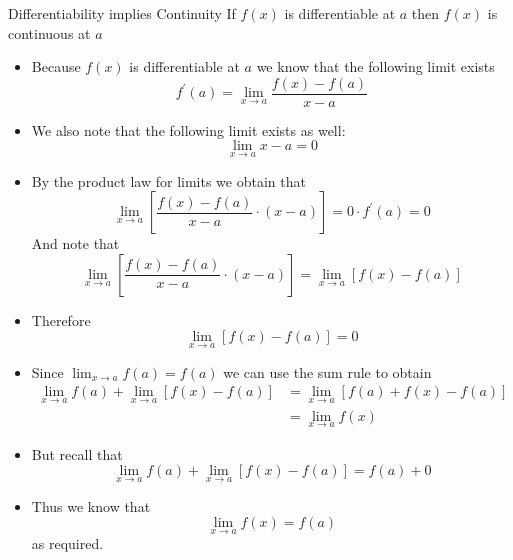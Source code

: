 \documentclass[preview]{standalone}
\begin{document}
\begin{theo*}{Differentiability implies Continuity}
  If $f\left(x\right)$ is differentiable at $a$ then $f\left(x\right)$ is continuous at $a$ 
  \begin{pf}
    \begin{itemize}
     \item Because $f\left(x\right)$ is differentiable at $a$  we know that the following limit exists 
       \[
       f ^{ \prime }\left(a\right) = \lim_{x \to a } \frac{ f\left(x\right)  -  f\left(a\right)}{ x  -  a}
       \]
      \item We also note that the following limit exists as well:
        \[
        \lim_{x\to a} x  -  a = 0
        \]
      \item By the product law for limits we obtain that 
        \[
        \lim_{x \to a} \left[ \frac{f\left(x\right)  -  f\left(a\right)}{x  -  a}  \cdot  \left( x  -  a \right)  \right] = 0  \cdot  f ^{\prime}\left(a\right) = 0
        \]
        And note that  
        \[
          \lim_{x \to a} \left[ \frac{f\left(x\right)  -  f\left(a\right)}{x  -  a}  \cdot  \left( x  -  a \right)  \right] = \lim_{x \to a} \left[f\left(x\right)  -  f\left(a\right)  \right]
        \]
        \item Therefore
          \[
          \lim_{x \to a} \left[f\left(x\right)  -  f\left(a\right)  \right] = 0
          \]
        \item Since $\lim_{x \to a} f\left(a\right) = f\left(a\right)$ we can use the sum rule to obtain 
          \begin{align*}
            \lim_{x \to a} f\left(a\right)  +  \lim_{x \to a} \left[ f\left(x\right)  -  f\left(a\right) \right] &= \lim_{x \to a} \left[ f\left(a\right)  +  f\left(x\right)  -  f\left(a\right) \right] \\
                                                                                                                 &= \lim_{x \to a} f\left(x\right) 
          \end{align*}
        \item But recall that 
          \[
            \lim_{x \to a} f\left(a\right)  +  \lim_{x \to a} \left[ f\left(x\right)  -  f\left(a\right) \right]  = f\left(a\right)  +  0
          \]
        \item Thus we know that 
          \[
          \lim_{x \to a} f\left(x\right) = f\left(a\right)
          \]
          as required.
    \end{itemize}
  \end{pf}
\end{theo*}
\end{document}
